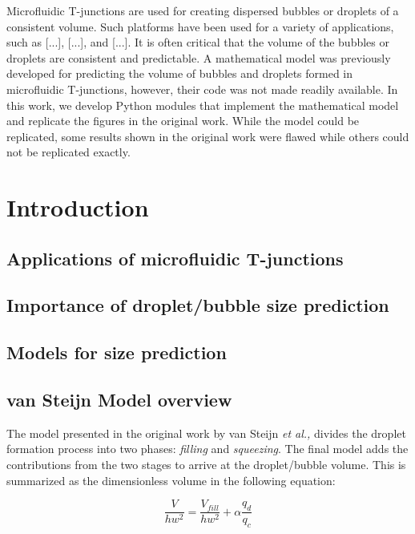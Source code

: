 Microfluidic T-junctions are used for creating dispersed bubbles or droplets
of a consistent volume. Such platforms have been used for a variety of applications,
such as [...], [...], and [...]. It is often critical that the volume of the
bubbles or droplets are consistent and predictable. A mathematical model was
previously developed for predicting the volume of bubbles and droplets formed in
microfluidic T-junctions, however, their code was not made readily available.
In this work, we develop Python modules that implement the mathematical model and 
replicate the figures in the original work. While the model
could be replicated, some results shown in the original work were flawed while others
could not be replicated exactly.

\section{Introduction}

\subsection{Applications of microfluidic T-junctions}

\subsection{Importance of droplet/bubble size prediction}

\subsection{Models for size prediction}

\subsection{van Steijn Model overview}

The model presented in the original work by van Steijn \emph{et al.,}\supercite{van_steijn_predictive_2010}
divides the droplet formation process into two phases: \emph{filling} and \emph{squeezing}. The final model
adds the contributions from the two stages to arrive at the droplet/bubble volume.
This is summarized as the dimensionless volume in the following equation:

\begin{equation}
  \frac{V}{hw^2} = \frac{V_{fill}}{hw^{2}}+\alpha\frac{q_{d}}{q_{c}}
\end{equation}

